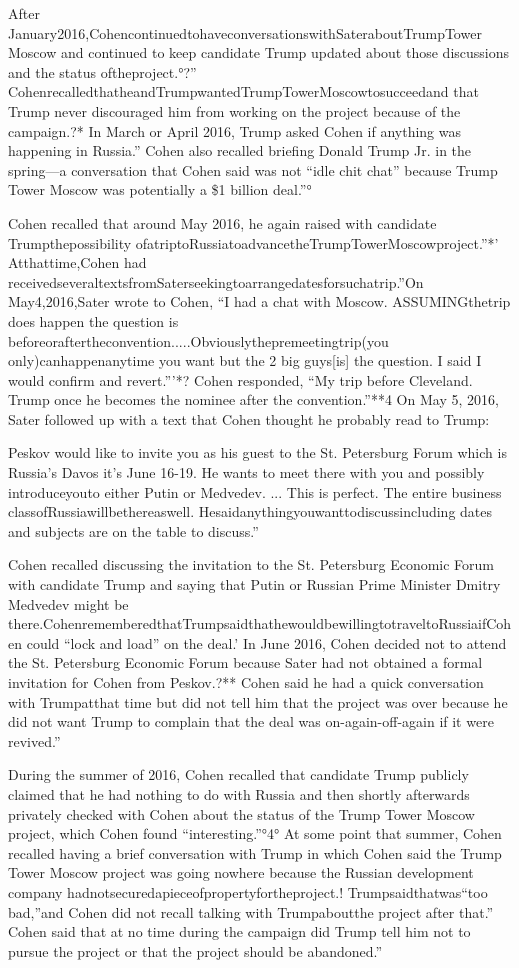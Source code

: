 After January2016,CohencontinuedtohaveconversationswithSateraboutTrumpTower Moscow and continued to keep candidate Trump updated about those discussions and the status oftheproject.°?” CohenrecalledthatheandTrumpwantedTrumpTowerMoscowtosucceedand that Trump never discouraged him from working on the project because of the campaign.?* In March or April 2016, Trump asked Cohen if anything was happening in Russia.” Cohen also recalled briefing Donald Trump Jr. in the spring—a conversation that Cohen said was not “idle chit chat” because Trump Tower Moscow was potentially a \$1 billion deal.”°

Cohen recalled that around May 2016, he again raised with candidate Trumpthepossibility ofatriptoRussiatoadvancetheTrumpTowerMoscowproject.”*' Atthattime,Cohen had receivedseveraltextsfromSaterseekingtoarrangedatesforsuchatrip.”On May4,2016,Sater wrote to Cohen, “I had a chat with Moscow. ASSUMINGthetrip does happen the question is beforeoraftertheconvention.....Obviouslythepremeetingtrip(you only)canhappenanytime you want but the 2 big guys[is] the question. I said I would confirm and revert.”'*? Cohen responded, “My trip before Cleveland. Trump once he becomes the nominee after the convention.”**4 On May 5, 2016, Sater followed up with a text that Cohen thought he probably read to Trump:

Peskov would like to invite you as his guest to the St. Petersburg Forum which is Russia's Davos it's June 16-19. He wants to meet there with you and possibly introduceyouto either Putin or Medvedev. ... This is perfect. The entire business classofRussiawillbethereaswell. Hesaidanythingyouwanttodiscussincluding dates and subjects are on the table to discuss.”

Cohen recalled discussing the invitation to the St. Petersburg Economic Forum with candidate Trump and saying that Putin or Russian Prime Minister Dmitry Medvedev might be there.CohenrememberedthatTrumpsaidthathewouldbewillingtotraveltoRussiaifCohen could “lock and load” on the deal.' In June 2016, Cohen decided not to attend the St. Petersburg Economic Forum because Sater had not obtained a formal invitation for Cohen from Peskov.?** Cohen said he had a quick conversation with Trumpatthat time but did not tell him that the project was over because he did not want Trump to complain that the deal was on-again-off-again if it were revived.”

During the summer of 2016, Cohen recalled that candidate Trump publicly claimed that he had nothing to do with Russia and then shortly afterwards privately checked with Cohen about the status of the Trump Tower Moscow project, which Cohen found “interesting.”°4° At some point that summer, Cohen recalled having a brief conversation with Trump in which Cohen said the Trump Tower Moscow project was going nowhere because the Russian development company hadnotsecuredapieceofpropertyfortheproject.! Trumpsaidthatwas“too bad,”and Cohen did not recall talking with Trumpaboutthe project after that.” Cohen said that at no time during the campaign did Trump tell him not to pursue the project or that the project should be abandoned.”

